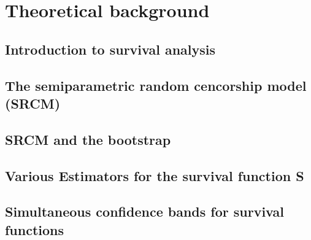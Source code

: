 \chapter{Theoretical background}



\section{Introduction to survival analysis}


\section{The semiparametric random cencorship model (SRCM)}


\section{SRCM and the bootstrap}


\section{Various Estimators for the survival function S}


\section{Simultaneous confidence bands for survival functions}